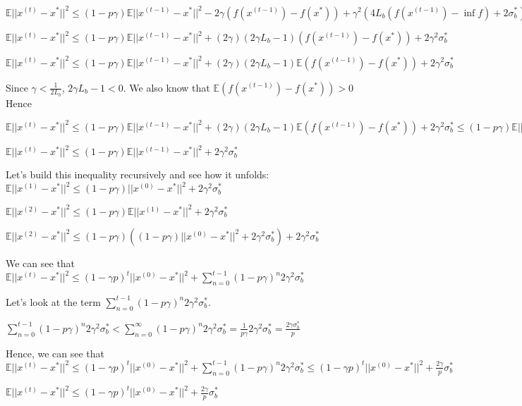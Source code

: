 $\mathbb{E}||x^{(t)} - x^*||^2  \leq (1 - p \gamma) \mathbb{E}||x^{(t - 1)} - x^*||^2 - 2\gamma(f(x^{(t - 1)}) - f(x^*)) + \gamma^2 (4L_{b} (f(x^{(t - 1)}) - \inf f) + 2 \sigma_b^*)$ \newline 

$\mathbb{E}||x^{(t)} - x^*||^2  \leq (1 - p \gamma) \mathbb{E}||x^{(t - 1)} - x^*||^2 + (2 \gamma) (2 \gamma L_{b} - 1)(f(x^{(t - 1)}) - f(x^*)) + 2\gamma^2 \sigma_b^*$ \newline 

$\mathbb{E}||x^{(t)} - x^*||^2  \leq (1 - p \gamma) \mathbb{E}||x^{(t - 1)} - x^*||^2 + (2 \gamma) (2 \gamma L_{b} - 1) \mathbb{E}(f(x^{(t - 1)}) - f(x^*)) + 2\gamma^2 \sigma_b^*$ \newline 

Since $\gamma < \frac{1}{2L_{b}}$, $2\gamma L_{b} - 1 < 0$. We also know that $\mathbb{E}(f(x^{(t - 1)}) - f(x^*)) > 0$ Hence \newline 

$\mathbb{E}||x^{(t)} - x^*||^2  \leq (1 - p \gamma) \mathbb{E}||x^{(t - 1)} - x^*||^2 + (2 \gamma) (2 \gamma L_{b} - 1) \mathbb{E}(f(x^{(t - 1)}) - f(x^*)) + 2\gamma^2 \sigma_b^* \leq (1 - p \gamma) \mathbb{E}||x^{(t - 1)} - x^*||^2 + 2\gamma^2 \sigma_b^*$ \newline 


$\mathbb{E}||x^{(t)} - x^*||^2  \leq (1 - p \gamma) \mathbb{E}||x^{(t - 1)} - x^*||^2 + 2\gamma^2 \sigma_b^*$ \newline 

Let's build this inequality recursively and see how it unfolds: \newline 
$\mathbb{E}||x^{(1)} - x^*||^2  \leq (1 - p \gamma) ||x^{(0)} - x^*||^2 + 2\gamma^2 \sigma_b^*$ \newline 

$\mathbb{E}||x^{(2)} - x^*||^2  \leq (1 - p \gamma) \mathbb{E}||x^{(1)} - x^*||^2 + 2\gamma^2 \sigma_b^*$ \newline 

$\mathbb{E}||x^{(2)} - x^*||^2  \leq (1 - p \gamma) ((1 - p \gamma) ||x^{(0)} - x^*||^2 + 2\gamma^2 \sigma_b^*) + 2\gamma^2 \sigma_b^*$ \newline 


We can see that $\mathbb{E}||x^{(t)} - x^*||^2 \leq (1 - \gamma p)^t ||x^{(0)} - x^*||^2 + \sum_{n=0}^{t - 1} (1 - p\gamma)^n 2\gamma^2 \sigma_b^*$

Let's look at the term $\sum_{n=0}^{t - 1} (1 - p\gamma)^n 2\gamma^2 \sigma_b^*$. 

$\sum_{n=0}^{t - 1} (1 - p\gamma)^n 2\gamma^2 \sigma_b^* < \sum_{n=0}^{\infty} (1 - p\gamma)^n 2\gamma^2 \sigma_b^* = \frac{1}{p\gamma} 2\gamma^2 \sigma_b^* = \frac{2\gamma \sigma_b^*}{p}$

Hence, we can see that \newline 
$\mathbb{E}||x^{(t)} - x^*||^2 \leq (1 - \gamma p)^t ||x^{(0)} - x^*||^2 + \sum_{n=0}^{t - 1} (1 - p\gamma)^n 2\gamma^2 \sigma_b^* \leq (1 - \gamma p)^t ||x^{(0)} - x^*||^2 + \frac{2 \gamma}{p} \sigma_b^*$

$\mathbb{E}||x^{(t)} - x^*||^2 \leq (1 - \gamma p)^t ||x^{(0)} - x^*||^2 + \frac{2 \gamma}{p} \sigma_b^*$
